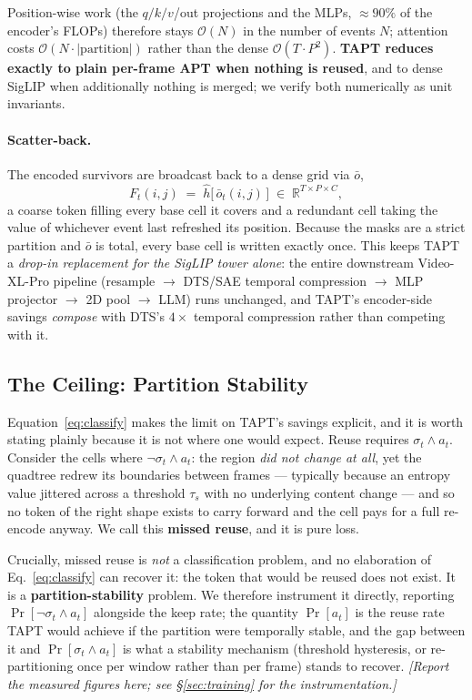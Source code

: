 Position-wise work (the $q/k/v$/out projections and the MLPs, $\approx\!90\%$ of
the encoder's FLOPs) therefore stays $\mathcal{O}(N)$ in the number of events $N$;
attention costs $\mathcal{O}(N \cdot |\text{partition}|)$ rather than the dense
$\mathcal{O}(T \cdot P^2)$. \textbf{TAPT reduces exactly to plain per-frame APT
when nothing is reused}, and to dense SigLIP when additionally nothing is merged;
we verify both numerically as unit invariants.

\paragraph{Scatter-back.}
The encoded survivors are broadcast back to a dense grid via $\bar{o}$,
\begin{equation}
  F_t(i,j) \;=\; \hat{h}\big[\,\bar{o}_t(i,j)\,\big] \;\in\; \mathbb{R}^{T \times P \times C},
\end{equation}
a coarse token filling every base cell it covers and a redundant cell taking the
value of whichever event last refreshed its position. Because the masks are a
strict partition and $\bar{o}$ is total, every base cell is written exactly once.
This keeps TAPT a \emph{drop-in replacement for the SigLIP tower alone}: the
entire downstream Video-XL-Pro pipeline (resample $\rightarrow$ DTS/SAE temporal
compression $\rightarrow$ MLP projector $\rightarrow$ 2D pool $\rightarrow$ LLM)
runs unchanged, and TAPT's encoder-side savings \emph{compose} with DTS's
$4\times$ temporal compression rather than competing with it.

\subsection{The Ceiling: Partition Stability}
\label{sec:missed}

Equation~\ref{eq:classify} makes the limit on TAPT's savings explicit, and it is
worth stating plainly because it is not where one would expect. Reuse requires
$\sigma_t \wedge a_t$. Consider the cells where $\neg\sigma_t \wedge a_t$: the
region \emph{did not change at all}, yet the quadtree redrew its boundaries
between frames --- typically because an entropy value jittered across a threshold
$\tau_s$ with no underlying content change --- and so no token of the right shape
exists to carry forward and the cell pays for a full re-encode anyway. We call
this \textbf{missed reuse}, and it is pure loss.

Crucially, missed reuse is \emph{not} a classification problem, and no
elaboration of Eq.~\ref{eq:classify} can recover it: the token that would be
reused does not exist. It is a \textbf{partition-stability} problem. We therefore
instrument it directly, reporting $\Pr[\neg\sigma_t \wedge a_t]$ alongside the
keep rate; the quantity $\Pr[a_t]$ is the reuse rate TAPT would achieve if the
partition were temporally stable, and the gap between it and $\Pr[\sigma_t \wedge
a_t]$ is what a stability mechanism (threshold hysteresis, or re-partitioning once
per window rather than per frame) stands to recover. \emph{[Report the measured
figures here; see \S\ref{sec:training} for the instrumentation.]}

